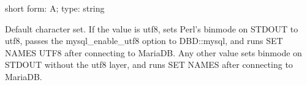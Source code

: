 \documentclass[letterpaper,10pt,english]{sphinxmanual}
\begin{document}
\begin{fulllineitems}
\label{\detokenize{mariadb-schema-change:cmdoption-mariadb-schema-change-charset}}
short form: \sphinxhyphen{}A; type: string

Default character set.  If the value is utf8, sets Perl’s binmode on
STDOUT to utf8, passes the mysql\_enable\_utf8 option to DBD::mysql, and runs SET
NAMES UTF8 after connecting to MariaDB.  Any other value sets binmode on STDOUT
without the utf8 layer, and runs SET NAMES after connecting to MariaDB.

\end{fulllineitems}

\end{document}
